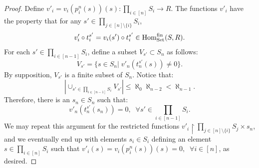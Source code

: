 \begin{proof}
Define $v'_i = v_i(p^n_i(s))(s): \prod_{i \in [n]} S_i \to R$. The functions $v'_i$ have the property that for any 
$s' \in \prod_{j \in  [n] \setminus \{i\}} S_i$, 
\[v'_i \circ t_i^{s'}=v_i(s') \circ t_i^{s'} \in \operatorname{Hom}^{\mathrm{fin}}_{\mathrm{Set}}(S,R).\]
For each $s' \in \prod_{i \in [n-1]} S_i$, define a subset $V_{s'} \subset S_n$ as follows:
\[V_{s'} = \{s \in S_n | \; v'_n(t_n^{s'}(s)) \neq 0 \}.\]
By supposition, $V_{s'}$ is a finite subset of $S_n$. Notice that:
\[|\cup_{s' \in \prod_{i \in [n-1]} S_i} V_{s'}| \le \aleph_0 \aleph_{n-2} < \aleph_{n-1}.\]
Therefore, there is an $s_{n} \in S_n$ such that:
\[v'_n(t_n^{s'}(s_n)) = 0, \; \; \forall s' \in \prod_{i \in [n-1]} S_i.\]
We may repeat this argument for the restricted functions $v'_i \restriction \prod_{j \in [n] \setminus \{i\}} S_j \times s_n$, 
and we eventually end up with elements $s_i \in S_i$ defining an element $s \in \prod_{i \in [n]}S_i$ such that 
$v'_i(s) = v_i(p^n_i(s))(s)=0, \; \; \forall i \in [n]$, as desired.
\end{proof}

